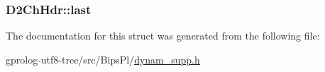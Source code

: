 \subsubsection[{\texorpdfstring{last}{last}}]{ D2\+Ch\+Hdr\+::last}\hypertarget{structD2ChHdr_a35d1cb0c22a72f9a49a6d26b9f8046c8}{}\label{structD2ChHdr_a35d1cb0c22a72f9a49a6d26b9f8046c8}


The documentation for this struct was generated from the following file\+:\begin{DoxyCompactItemize}
\item 
gprolog-\/utf8-\/tree/src/\+Bips\+Pl/\hyperlink{dynam__supp_8h}{dynam\+\_\+supp.\+h}\end{DoxyCompactItemize}
